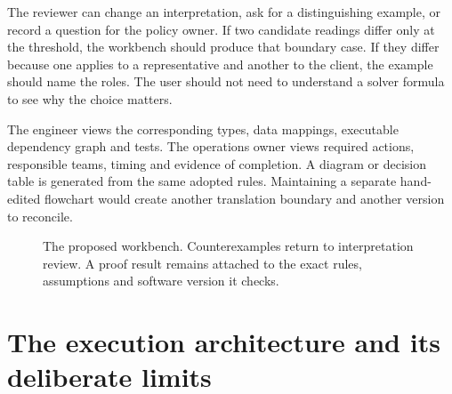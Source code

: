 \documentclass[12pt,a4paper,oneside,openany]{book}
\begin{document}
The reviewer can change an interpretation, ask for a distinguishing example, or
record a question for the policy owner. If two candidate readings differ only at
the threshold, the workbench should produce that boundary case. If they differ
because one applies to a representative and another to the client, the example
should name the roles. The user should not need to understand a solver formula
to see why the choice matters.

The engineer views the corresponding types, data mappings, executable dependency
graph and tests. The operations owner views required actions, responsible teams,
timing and evidence of completion. A diagram or decision table is generated from
the same adopted rules. Maintaining a separate hand-edited flowchart would create
another translation boundary and another version to reconcile.

\begin{figure}[htbp]
\centering
{}
\caption{The proposed workbench. Counterexamples return to interpretation review.
A proof result remains attached to the exact rules, assumptions and software
version it checks.}
\label{fig:architecture}
\end{figure}

\section{The execution architecture and its deliberate limits}
\label{merge:P-03-product:07}
\end{document}
